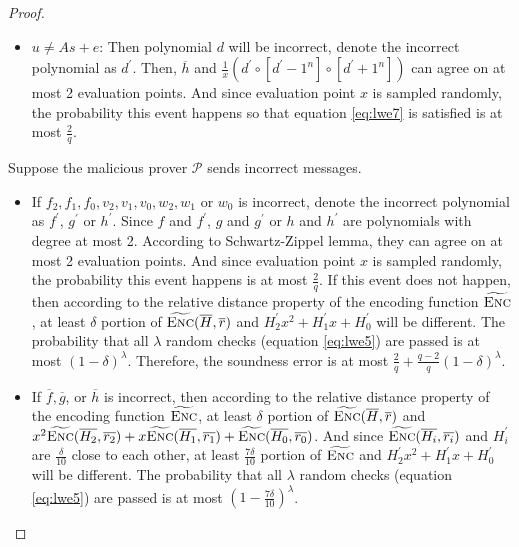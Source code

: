 \begin{proof}
\begin{itemize}
    \item $u \neq As + e$: Then polynomial $d$ will be incorrect, denote the incorrect polynomial as $d^\prime$. Then, $\overline{h}$ and $\frac{1}{x} (d^\prime \circ [d^\prime - 1^n] \circ [d^\prime + 1^n])$ can agree on at most 2 evaluation points. And since evaluation point $x$ is sampled randomly, the probability this event happens so that equation \ref{eq:lwe7} is satisfied is at most $\frac{2}{q}$. 
    
\end{itemize}

Suppose the malicious prover $\mathcal{P}$ sends incorrect messages. 
\begin{itemize}
    
    \item If $f_2, f_1, f_0, v_2, v_1, v_0, w_2, w_1$ or $w_0$ is incorrect, denote the incorrect polynomial as $f^\prime$, $g^\prime$ or $h^\prime$. Since $f$ and $f^\prime$, $g$ and $g^\prime$ or $h$ and $h^\prime$ are polynomials with degree at most 2. According to Schwartz-Zippel lemma, they can agree on at most 2 evaluation points. And since evaluation point $x$ is sampled randomly, the probability this event happens is at most $\frac{2}{q}$. If this event does not happen, then according to the relative distance property of the encoding function $\widetilde{\textsc{Enc}}$, at least $\delta$ portion of $\widetilde{\textsc{Enc}}(\overline{H}, \overline{r})$ and $H_2^\prime x^2 + H_1^\prime x + H_0^\prime$ will be different. The probability that all $\lambda$ random checks (equation \ref{eq:lwe5}) are passed is at most $(1 - \delta)^\lambda$. Therefore, the soundness error is at most $\frac{2}{q} + \frac{q-2}{q}(1 - \delta)^\lambda$.

    \item If $\overline{f}, \overline{g}$, or $\overline{h}$ is incorrect, 
    then according to the relative distance property of the encoding function $\widetilde{\textsc{Enc}}$, 
    at least $\delta$ portion of $\widetilde{\textsc{Enc}}(\overline{H}, \overline{r})$ and
    $x^2\widetilde{\textsc{Enc}}(\overline{H_2}, \overline{r_2}) + x\widetilde{\textsc{Enc}}(\overline{H_1}, \overline{r_1}) + \widetilde{\textsc{Enc}}(\overline{H_0}, \overline{r_0})$.
    And since $\widetilde{\textsc{Enc}}(\overline{H_i}, \overline{r_i})$ and $H_i^\prime$ are $\frac{\delta}{10}$ close to each other, at least $\frac{7\delta}{10}$ portion of $\widetilde{\textsc{Enc}}$ and 
    $H_2^\prime x^2 + H_1^\prime x + H_0^\prime$ will be different. The probability that all $\lambda$ random checks (equation \ref{eq:lwe5}) are passed is at most $(1 - \frac{7\delta}{10})^\lambda$.
    

\end{itemize}
\end{proof}

